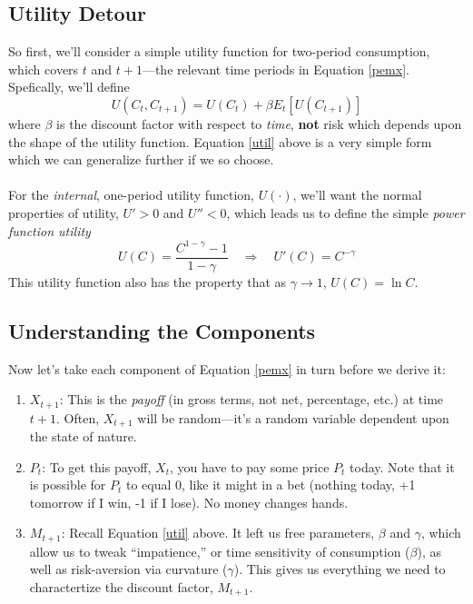 \documentclass[a4paper,12pt]{scrartcl}
\begin{document}
\subsection{Utility Detour}

So first, we'll consider a simple utility function for two-period
consumption, which covers $t$ and $t+1$---the relevant time periods
in Equation \ref{pemx}. Spefically, we'll define
\begin{equation}
    \label{util}
    U(C_t, C_{t+1}) = U(C_t) + \beta E_t\left[U(C_{t+1})\right]
\end{equation}
where $\beta$ is the discount factor with respect to \emph{time},
\textbf{not} risk which depends upon the shape of the utility function.
Equation \ref{util} above is a very simple form which we can generalize
further if we so choose.
\\
\\
For the \emph{internal}, one-period utility function, $U(\cdot)$, we'll want
the normal properties of utility, $U'>0$ and $U''<0$, which leads
us to define the simple \emph{power function utility}
\begin{equation}
    \label{upwr}
    U(C) = \frac{C^{1-\gamma}-1}{1-\gamma} \quad\Rightarrow\quad
	U'(C) = C^{-\gamma}
\end{equation}
This utility function also has the property that as $\gamma\rightarrow 1$,
$U(C) = \ln C$.

\subsection{Understanding the Components}

Now let's take each component of Equation \ref{pemx} in turn
before we derive it:
\begin{enumerate}
    \item $X_{t+1}$: This is the \emph{payoff} (in gross
	terms, not net, percentage, etc.) at time $t+1$.  Often, 
	$X_{t+1}$ 
	will be random---it's a random variable dependent upon
	the state of nature.
    \item $P_t$: To get this payoff, $X_t$, you have to pay some 
	price $P_t$ today. Note that
	it is possible for $P_t$ to equal 0, like it might in a 
	bet (nothing today, +1 tomorrow if I win, -1 if I lose). 
	No money changes hands.
    \item $M_{t+1}$: Recall Equation \ref{util} above.  It left
	us free parameters, $\beta$ and $\gamma$, which allow us
	to tweak ``impatience,'' or time sensitivity of 
	consumption ($\beta$), as well as risk-aversion via 
	curvature ($\gamma$).
	This gives us everything we need to charactertize the 
	discount factor, $M_{t+1}$.
\end{enumerate}
\end{document}
